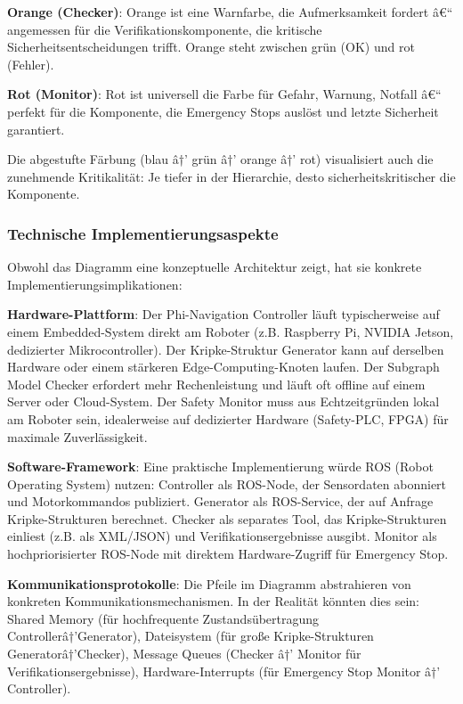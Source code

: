 ﻿\documentclass[a4paper,12pt]{article}
\theoremstyle{definition}
\begin{document}
\textbf{Orange (Checker)}: Orange ist eine Warnfarbe, die Aufmerksamkeit fordert â€“ angemessen für die Verifikationskomponente, die kritische Sicherheitsentscheidungen trifft. Orange steht zwischen grün (OK) und rot (Fehler).

\textbf{Rot (Monitor)}: Rot ist universell die Farbe für Gefahr, Warnung, Notfall â€“ perfekt für die Komponente, die Emergency Stops auslöst und letzte Sicherheit garantiert.

Die abgestufte Färbung (blau â†’ grün â†’ orange â†’ rot) visualisiert auch die zunehmende Kritikalität: Je tiefer in der Hierarchie, desto sicherheitskritischer die Komponente.

\subsubsection{Technische Implementierungsaspekte}

Obwohl das Diagramm eine konzeptuelle Architektur zeigt, hat sie konkrete Implementierungsimplikationen:

\textbf{Hardware-Plattform}: Der Phi-Navigation Controller läuft typischerweise auf einem Embedded-System direkt am Roboter (z.B. Raspberry Pi, NVIDIA Jetson, dedizierter Mikrocontroller). Der Kripke-Struktur Generator kann auf derselben Hardware oder einem stärkeren Edge-Computing-Knoten laufen. Der Subgraph Model Checker erfordert mehr Rechenleistung und läuft oft offline auf einem Server oder Cloud-System. Der Safety Monitor muss aus Echtzeitgründen lokal am Roboter sein, idealerweise auf dedizierter Hardware (Safety-PLC, FPGA) für maximale Zuverlässigkeit.

\textbf{Software-Framework}: Eine praktische Implementierung würde ROS (Robot Operating System) nutzen: Controller als ROS-Node, der Sensordaten abonniert und Motorkommandos publiziert. Generator als ROS-Service, der auf Anfrage Kripke-Strukturen berechnet. Checker als separates Tool, das Kripke-Strukturen einliest (z.B. als XML/JSON) und Verifikationsergebnisse ausgibt. Monitor als hochpriorisierter ROS-Node mit direktem Hardware-Zugriff für Emergency Stop.

\textbf{Kommunikationsprotokolle}: Die Pfeile im Diagramm abstrahieren von konkreten Kommunikationsmechanismen. In der Realität könnten dies sein: Shared Memory (für hochfrequente Zustandsübertragung Controllerâ†’Generator), Dateisystem (für große Kripke-Strukturen Generatorâ†’Checker), Message Queues (Checker â†’ Monitor für Verifikationsergebnisse), Hardware-Interrupts (für Emergency Stop Monitor â†’ Controller).
\end{document}
